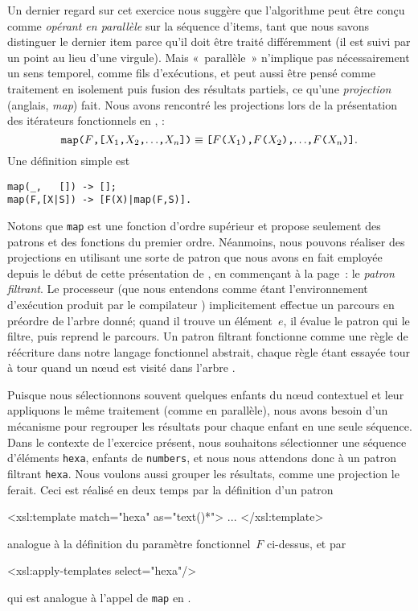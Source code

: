 Un dernier regard sur cet exercice nous suggère que l'algorithme peut
être conçu comme \emph{opérant en parallèle} sur la séquence d'items,
tant que nous savons distinguer le dernier item parce qu'il doit être
traité différemment (il est suivi par un point au lieu d'une
virgule). Mais «~parallèle~» n'implique pas nécessairement un sens
temporel, comme fils d'exécutions, et peut aussi être pensé comme
traitement en isolement puis fusion des résultats partiels, ce qu'une
\emph{projection} (anglais, \emph{map}) fait. Nous avons rencontré les
projections lors de la présentation des itérateurs fonctionnels en
\Erlang, :
\begin{equation*}
\texttt{map(\(F\),[\(X_1\),\(X_2\),\(\ldots\),\(X_{n}\)])}
\equiv
\texttt{[\(F\)(\(X_1\)),\(F\)(\(X_2\)),\(\ldots\),\(F\)(\(X_{n}\))]}.
\end{equation*}
Une définition simple est
\begin{verbatim}
map(_,   []) -> [];
map(F,[X|S]) -> [F(X)|map(F,S)].
\end{verbatim}
Notons que \texttt{map} est une fonction d'ordre supérieur et \XSLT
propose seulement des patrons et des fonctions du premier
ordre. Néanmoins, nous pouvons réaliser des projections en utilisant
une sorte de patron que nous avons en fait employée depuis le début de
cette présentation de \XSLT, en commençant à la
page~\pageref{par:matching}: le \emph{patron filtrant}. Le processeur
\XSLT (que nous entendons comme étant l'environnement d'exécution
produit par le compilateur \XSLT) implicitement effectue un parcours
en préordre de l'arbre \XML donné; quand il trouve un élément~\(e\),
il évalue le patron qui le filtre, puis reprend le parcours. Un patron
filtrant fonctionne comme une règle de réécriture dans notre langage
fonctionnel abstrait, chaque règle étant essayée tour à tour quand un
n{\oe}ud est visité dans l'arbre \XML.

Puisque nous sélectionnons souvent quelques enfants du n{\oe}ud
contextuel et leur appliquons le même traitement (comme en parallèle),
nous avons besoin d'un mécanisme pour regrouper les résultats pour
chaque enfant en une seule séquence. Dans le contexte de l'exercice
présent, nous souhaitons sélectionner une séquence d'éléments
\texttt{hexa}, enfants de \texttt{numbers}, et nous nous attendons
donc à un patron filtrant \texttt{hexa}. Nous voulons aussi grouper
les résultats, comme une projection le ferait. Ceci est réalisé en
deux temps par la définition d'un patron
\begin{sverb}
  <xsl:template match="hexa" as="text()*">
    ...
  </xsl:template>
\end{sverb}
analogue à la définition du paramètre fonctionnel~\(F\) ci-dessus, et
par
\begin{sverb}
    <xsl:apply-templates select="hexa"/>
\end{sverb}
qui est analogue à l'appel de \texttt{map} en
\Erlang.\label{match_as_map}

